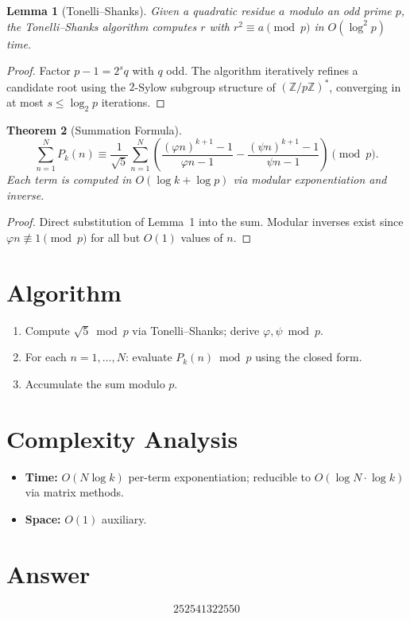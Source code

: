 \documentclass[11pt]{article}
\newtheorem{theorem}{Theorem}
\newtheorem{lemma}[theorem]{Lemma}
\begin{document}
\begin{lemma}[Tonelli--Shanks]
Given a quadratic residue $a$ modulo an odd prime $p$, the Tonelli--Shanks algorithm computes $r$ with $r^2 \equiv a \pmod{p}$ in $O(\log^2 p)$ time.
\end{lemma}

\begin{proof}
Factor $p - 1 = 2^s q$ with $q$ odd. The algorithm iteratively refines a candidate root using the $2$-Sylow subgroup structure of $(\mathbb{Z}/p\mathbb{Z})^*$, converging in at most $s \leq \log_2 p$ iterations.
\end{proof}

\begin{theorem}[Summation Formula]
\[
\sum_{n=1}^{N} P_k(n) \equiv \frac{1}{\sqrt{5}} \sum_{n=1}^{N} \left( \frac{(\varphi n)^{k+1} - 1}{\varphi n - 1} - \frac{(\psi n)^{k+1} - 1}{\psi n - 1} \right) \pmod{p}.
\]
Each term is computed in $O(\log k + \log p)$ via modular exponentiation and inverse.
\end{theorem}

\begin{proof}
Direct substitution of Lemma~1 into the sum. Modular inverses exist since $\varphi n \not\equiv 1 \pmod{p}$ for all but $O(1)$ values of $n$.
\end{proof}

\section{Algorithm}
\begin{enumerate}
    \item Compute $\sqrt{5} \bmod p$ via Tonelli--Shanks; derive $\varphi, \psi \bmod p$.
    \item For each $n = 1, \ldots, N$: evaluate $P_k(n) \bmod p$ using the closed form.
    \item Accumulate the sum modulo $p$.
\end{enumerate}

\section{Complexity Analysis}
\begin{itemize}
    \item \textbf{Time:} $O(N \log k)$ per-term exponentiation; reducible to $O(\log N \cdot \log k)$ via matrix methods.
    \item \textbf{Space:} $O(1)$ auxiliary.
\end{itemize}

\section{Answer}

\[
\boxed{252541322550}
\]
\end{document}

